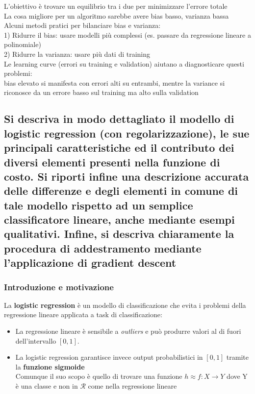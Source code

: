\documentclass[10pt,oneside,a4paper]{article}
\begin{document}
	L'obiettivo è trovare un equilibrio tra i due per minimizzare l'errore totale\\
	La cosa migliore per un algoritmo sarebbe avere bias basso, varianza bassa\\
	Alcuni metodi pratici per bilanciare bias e varianza:\\
	1) Ridurre il bias: usare modelli più complessi (es. passare da regressione lineare a polinomiale)\\
	2) Ridurre la varianza: usare più dati di training\\
	Le learning curve (errori su training e validation) aiutano a diagnosticare questi problemi:\\
	bias elevato si manifesta con errori alti su entrambi, mentre la variance si riconosce da un errore basso sul training ma alto sulla validation\\

	
	
	\subsection{Si descriva in modo dettagliato il
		modello di logistic regression (con regolarizzazione), le sue principali caratteristiche ed il contributo dei diversi elementi presenti nella funzione
		di costo. Si riporti infine una descrizione accurata delle differenze e degli elementi in comune di tale modello rispetto
		ad un semplice classificatore lineare, anche mediante esempi qualitativi. Infine, si descriva chiaramente la procedura di addestramento
		mediante l’applicazione di gradient descent}
		
	\subsubsection{Introduzione e motivazione}
	La \textbf{logistic regression} è un modello di classificazione che evita i problemi della regressione lineare applicata a task di classificazione:
	\begin{itemize}
		\item La regressione lineare è sensibile a \textit{outliers} e può produrre valori al di fuori dell'intervallo $[0,1]$.
		\item La logistic regression garantisce invece output probabilistici in $[0,1]$ tramite la \textbf{funzione sigmoide}\\
		Comunque il suo scopo è quello di trovare una funzione $h \approx f: X \to Y$ dove Y è una classe e non in $\mathcal{R}$ come nella regressione lineare
	\end{itemize}
	
\end{document}
